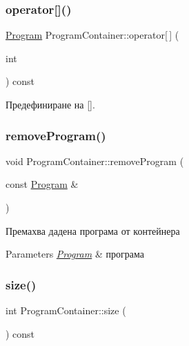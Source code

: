\subsubsection{\texorpdfstring{operator[]()}{operator[]()}}
{\footnotesize\ttfamily \hyperlink{class_program}{Program} Program\+Container\+::operator\mbox{[}$\,$\mbox{]} (\begin{DoxyParamCaption}\item[{int}]{ }\end{DoxyParamCaption}) const}



Предефиниране на \mbox{[}\mbox{]}. 

\mbox{\label{class_program_container_a856d6d075c9fc8410d2f5c7dbd915f7f}} 
\subsubsection{\texorpdfstring{remove\+Program()}{removeProgram()}}
{\footnotesize\ttfamily void Program\+Container\+::remove\+Program (\begin{DoxyParamCaption}\item[{const \hyperlink{class_program}{Program} \&}]{ }\end{DoxyParamCaption})}



Премахва дадена програма от контейнера 


\begin{DoxyParams}{Parameters}
{\em \hyperlink{class_program}{Program}} & програма \\
\hline
\end{DoxyParams}
\mbox{\label{class_program_container_a6dc1ecf361eb185c1149d1ee6ad01645}} 
\subsubsection{\texorpdfstring{size()}{size()}}
{\footnotesize\ttfamily int Program\+Container\+::size (\begin{DoxyParamCaption}{ }\end{DoxyParamCaption}) const}

